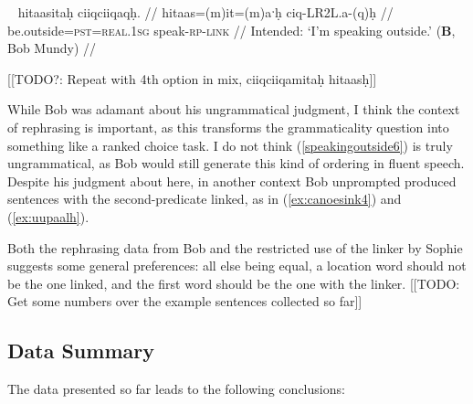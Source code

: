 \ex~ \label{speakingoutside6}
\begingl
\glpreamble *hitaasitaḥ ciiqciiqaqḥ. //
\gla hitaas=(m)it=(m)aˑḥ ciq-LR2L.a-(q)ḥ //
\glb be.outside=\textsc{pst}=\textsc{real.1sg} speak-\textsc{rp}-\textsc{link} //
\glft Intended: `I'm speaking outside.' (\textbf{B}, Bob Mundy) //
\endgl
\xe

[[TODO?: Repeat with 4th option in mix, ciiqciiqamitaḥ hitaasḥ]]

While Bob was adamant about his ungrammatical judgment, I think the context of rephrasing is important, as this transforms the grammaticality question into something like a ranked choice task. I do not think (\ref{speakingoutside6}) is truly ungrammatical, as Bob would still generate this kind of ordering in fluent speech. Despite his judgment about here, in another context Bob unprompted produced sentences with the second-predicate linked, as in (\ref{ex:canoesink4}) and (\ref{ex:uupaalh}).

Both the rephrasing data from Bob and the restricted use of the linker by Sophie suggests some general preferences: all else being equal, a location word should not be the one linked, and the first word should be the one with the linker. [[TODO: Get some numbers over the example sentences collected so far]]

\subsection{Data Summary}

The data presented so far leads to the following conclusions:


